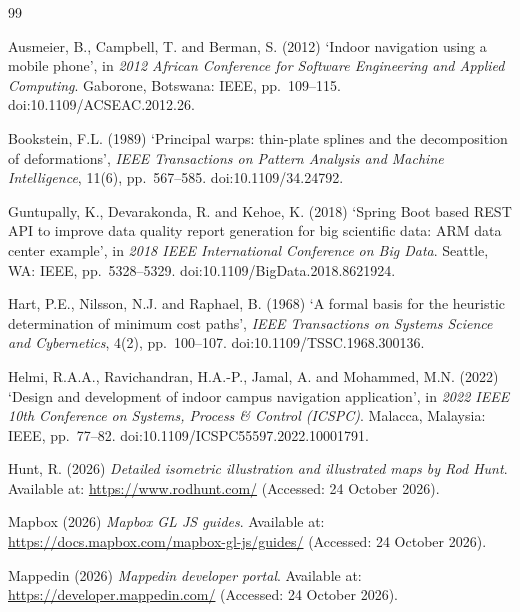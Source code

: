 \documentclass[12pt,a4paper]{report}
\begin{document}
\begin{thebibliography}{99}

Ausmeier, B., Campbell, T. and Berman, S. (2012) `Indoor navigation using a mobile phone', in \emph{2012 African Conference for Software Engineering and Applied Computing}. Gaborone, Botswana: IEEE, pp.~109--115. doi:10.1109/ACSEAC.2012.26.

Bookstein, F.L. (1989) `Principal warps: thin-plate splines and the decomposition of deformations', \emph{IEEE Transactions on Pattern Analysis and Machine Intelligence}, 11(6), pp.~567--585. doi:10.1109/34.24792.

Guntupally, K., Devarakonda, R. and Kehoe, K. (2018) `Spring Boot based REST API to improve data quality report generation for big scientific data: ARM data center example', in \emph{2018 IEEE International Conference on Big Data}. Seattle, WA: IEEE, pp.~5328--5329. doi:10.1109/BigData.2018.8621924.

Hart, P.E., Nilsson, N.J. and Raphael, B. (1968) `A formal basis for the heuristic determination of minimum cost paths', \emph{IEEE Transactions on Systems Science and Cybernetics}, 4(2), pp.~100--107. doi:10.1109/TSSC.1968.300136.

Helmi, R.A.A., Ravichandran, H.A.-P., Jamal, A. and Mohammed, M.N. (2022) `Design and development of indoor campus navigation application', in \emph{2022 IEEE 10th Conference on Systems, Process \& Control (ICSPC)}. Malacca, Malaysia: IEEE, pp.~77--82. doi:10.1109/ICSPC55597.2022.10001791.

Hunt, R. (2026) \emph{Detailed isometric illustration and illustrated maps by Rod Hunt}. Available at: \url{https://www.rodhunt.com/} (Accessed: 24 October 2026).

Mapbox (2026) \emph{Mapbox GL JS guides}. Available at: \url{https://docs.mapbox.com/mapbox-gl-js/guides/} (Accessed: 24 October 2026).

Mappedin (2026) \emph{Mappedin developer portal}. Available at: \url{https://developer.mappedin.com/} (Accessed: 24 October 2026).


\end{thebibliography}
\end{document}

